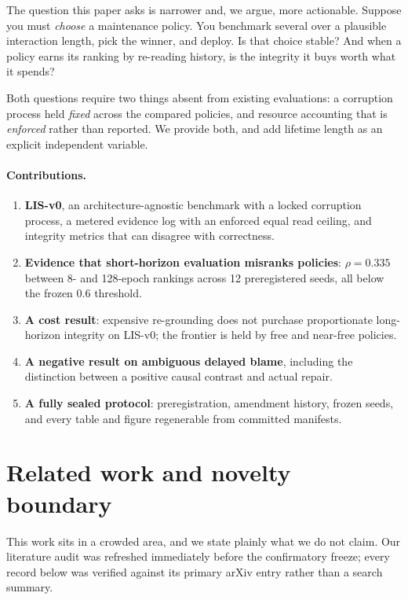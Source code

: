 \documentclass[11pt]{article}
\begin{document}
The question this paper asks is narrower and, we argue, more actionable. Suppose
you must \emph{choose} a maintenance policy. You benchmark several over a
plausible interaction length, pick the winner, and deploy. Is that choice stable?
And when a policy earns its ranking by re-reading history, is the integrity it
buys worth what it spends?

Both questions require two things absent from existing evaluations: a corruption
process held \emph{fixed} across the compared policies, and resource accounting
that is \emph{enforced} rather than reported. We provide both, and add lifetime
length as an explicit independent variable.

\paragraph{Contributions.}
\begin{enumerate}\itemsep2pt
\item \textbf{LIS-v0}, an architecture-agnostic benchmark with a locked corruption
      process, a metered evidence log with an enforced equal read ceiling, and
      integrity metrics that can disagree with correctness.
\item \textbf{Evidence that short-horizon evaluation misranks policies}:
      $\rho = 0.335$ between 8- and 128-epoch rankings across 12 preregistered
      seeds, all below the frozen $0.6$ threshold.
\item \textbf{A cost result}: expensive re-grounding does not purchase
      proportionate long-horizon integrity on LIS-v0; the frontier is held by
      free and near-free policies.
\item \textbf{A negative result on ambiguous delayed blame}, including the
      distinction between a positive causal contrast and actual repair.
\item \textbf{A fully sealed protocol}: preregistration, amendment history,
      frozen seeds, and every table and figure regenerable from committed
      manifests.
\end{enumerate}

\section{Related work and novelty boundary}
\label{sec:related}

This work sits in a crowded area, and we state plainly what we do not claim.
Our literature audit was refreshed immediately before the confirmatory freeze;
every record below was verified against its primary arXiv entry rather than a
search summary.
\end{document}
